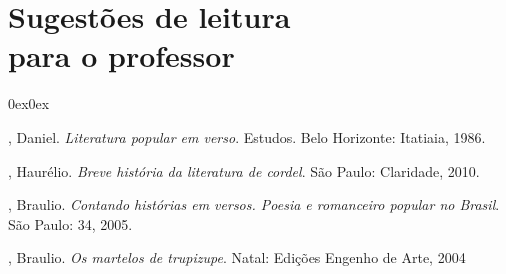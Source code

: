 \section{Sugestões de leitura\\ para o professor} 

\begin{description}0ex\parsep0ex

, Daniel. \textit{Literatura popular em verso}. Estudos. Belo Horizonte: Itatiaia, 1986. 

, Haurélio. \textit{Breve história da literatura de cordel}. São Paulo: Claridade, 2010.

, Braulio. \textit{Contando histórias em versos. Poesia e romanceiro popular no Brasil}. São Paulo: 34, 2005.

, Braulio. \textit{Os martelos de trupizupe}. Natal: Edições Engenho de Arte, 2004 

\end{description}

\paginabranca
\paginabranca
\paginabranca
\paginabranca
\paginabranca
\paginabranca
\paginabranca
\paginabranca
